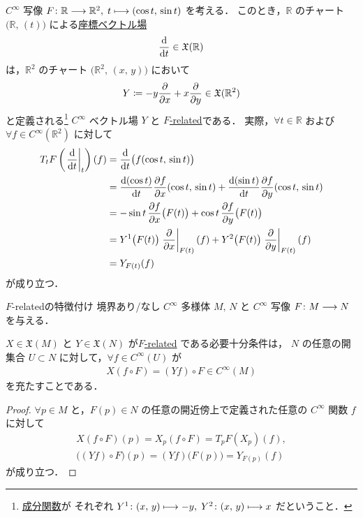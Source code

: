 \documentclass[TQFT_main]{subfiles}
\begin{document}
\begin{myexample}[]{}
    $C^\infty$ 写像 $F \colon \mathbb{R} \longrightarrow \mathbb{R}^2,\; t\longmapsto (\cos t,\, \sin t)$ を考える．
    このとき，$\mathbb{R}$ のチャート $\bigl(\mathbb{R},\, (t)\bigr)$ による\hyperref[def:coord-vecf]{座標ベクトル場}
    \begin{align}
        \dv{}{t} \in \mathfrak{X}(\mathbb{R})
    \end{align}
    は，$\mathbb{R}^2$ のチャート $\bigl(\mathbb{R}^2,\, (x,\, y)\bigr)$ において
    \begin{align}
        Y \coloneqq - y \pdv{}{x} + x \pdv{}{y} \in \mathfrak{X} (\mathbb{R}^2)
    \end{align}
    と定義される\footnote{\hyperref[def:vecf]{成分関数}が それぞれ $Y^1 \colon (x,\, y) \longmapsto -y,\; Y^2 \colon (x,\, y) \longmapsto x$ だということ．} $C^\infty$ ベクトル場 $Y$ と \hyperref[def:F-related]{$F$-related}である．
    実際，$\forall t \in \mathbb{R}$ および $\forall f \in C^\infty (\mathbb{R}^2)$ に対して
    \begin{align}
        T_t F\left(\eval{\dv{}{t}}_t\right) (f) &= \dv{}{t}() \bigl( f(\cos t,\, \sin t) \bigr) \\
        &= \dv{(\cos t)}{t} \pdv{f}{x}()(\cos t,\, \sin t) + \dv{(\sin t)}{t} \pdv{f}{y}()(\cos t,\, \sin t) \\
        &= - \sin t \, \pdv{f}{x}()\bigl(F(t)\bigr) + \cos t \, \pdv{f}{y} \bigl(F(t)\bigr) \\
        &= Y^1 \bigl( F(t) \bigr)  \eval{\pdv{}{x}}_{F(t)}(f) + Y^2 \bigl( F(t) \bigr)  \eval{\pdv{}{y}}_{F(t)} (f) \\
        &= Y_{F(t)} (f)
    \end{align}
    が成り立つ．
\end{myexample}


\begin{myprop}[label=prop:F-related]{$F$-relatedの特徴付け}
    境界あり/なし $C^\infty$ 多様体 $M,\, N$ と $C^\infty$ 写像 $F \colon M \longrightarrow N$ を与える．

    $X \in \mathfrak{X}(M)$ と $Y \in \mathfrak{X}(N)$ が\hyperref[def:F-related]{$F$-related} である必要十分条件は，
    $N$ の任意の開集合 $U \subset N$ に対して，$\forall f \in C^\infty (U)$ が
    \begin{align}
        X(f \circ F) = (Y f) \circ F \in C^\infty (M)
    \end{align}
    を充たすことである．
\end{myprop}

\begin{proof}
    $\forall p \in M$ と，$F(p) \in N$ の任意の開近傍上で定義された任意の $C^\infty$ 関数 $f$ に対して
    \begin{align}
        X(f \circ F)(p) = X_p (f \circ F) = T_p F (X_p) (f), \\
        \bigl((Yf) \circ F\bigr)(p) = (Yf) \bigl( F(p) \bigr) = Y_{F(p)} (f)
    \end{align}
    が成り立つ．
\end{proof}
\end{document}
